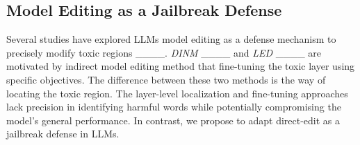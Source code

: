 
\subsection{Model Editing as a Jailbreak Defense}
Several studies have explored LLMs model editing as a defense mechanism to precisely modify toxic regions ____.
\textit{DINM} ____ and \textit{LED} ____ are motivated by indirect model editing method that fine-tuning the toxic layer using specific objectives. The difference between these two methods is the way of locating the toxic region. 
The layer-level localization and fine-tuning approaches lack precision in identifying harmful words while potentially compromising the model's general performance.
In contrast, we propose to adapt direct-edit as a jailbreak defense in LLMs. 
